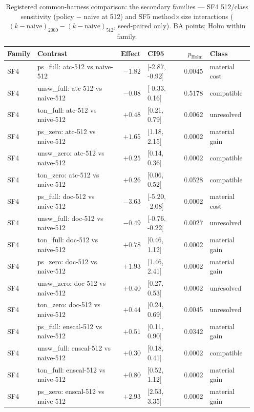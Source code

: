 \begin{table}[t]
\centering
\caption{Registered common-harness comparison: the secondary families --- SF4 512/class sensitivity (policy $-$ naive at 512) and SF5 method$\times$size interactions ($(k-\mathrm{naive})_{2000}-(k-\mathrm{naive})_{512}$, seed-paired only). BA points; Holm within family.}
\label{tab:common_harness_supp_secondary}
\scriptsize
\setlength{\tabcolsep}{3pt}
\begin{tabular}{l l r l r l}
\toprule
Family & Contrast & Effect & CI95 & $p_{\mathrm{Holm}}$ & Class \\
\midrule
SF4 & ps\_full: atc-512 vs naive-512 & $-1.82$ & [-2.87, -0.92] & 0.0045 & material cost \\
SF4 & unsw\_full: atc-512 vs naive-512 & $-0.08$ & [-0.33, 0.16] & 0.5178 & compatible \\
SF4 & ton\_full: atc-512 vs naive-512 & $+0.48$ & [0.21, 0.79] & 0.0062 & unresolved \\
SF4 & ps\_zero: atc-512 vs naive-512 & $+1.65$ & [1.18, 2.15] & 0.0002 & material gain \\
SF4 & unsw\_zero: atc-512 vs naive-512 & $+0.25$ & [0.14, 0.36] & 0.0002 & compatible \\
SF4 & ton\_zero: atc-512 vs naive-512 & $+0.26$ & [0.06, 0.52] & 0.0528 & compatible \\
SF4 & ps\_full: doc-512 vs naive-512 & $-3.63$ & [-5.20, -2.08] & 0.0002 & material cost \\
SF4 & unsw\_full: doc-512 vs naive-512 & $-0.49$ & [-0.76, -0.22] & 0.0027 & unresolved \\
SF4 & ton\_full: doc-512 vs naive-512 & $+0.78$ & [0.46, 1.12] & 0.0002 & material gain \\
SF4 & ps\_zero: doc-512 vs naive-512 & $+1.93$ & [1.46, 2.41] & 0.0002 & material gain \\
SF4 & unsw\_zero: doc-512 vs naive-512 & $+0.40$ & [0.27, 0.53] & 0.0002 & unresolved \\
SF4 & ton\_zero: doc-512 vs naive-512 & $+0.44$ & [0.24, 0.69] & 0.0045 & unresolved \\
SF4 & ps\_full: enscal-512 vs naive-512 & $+0.51$ & [0.11, 0.90] & 0.0342 & material gain \\
SF4 & unsw\_full: enscal-512 vs naive-512 & $+0.30$ & [0.18, 0.41] & 0.0002 & compatible \\
SF4 & ton\_full: enscal-512 vs naive-512 & $+0.80$ & [0.52, 1.12] & 0.0002 & material gain \\
SF4 & ps\_zero: enscal-512 vs naive-512 & $+2.93$ & [2.53, 3.35] & 0.0002 & material gain \\

\end{tabular}
\end{table}
